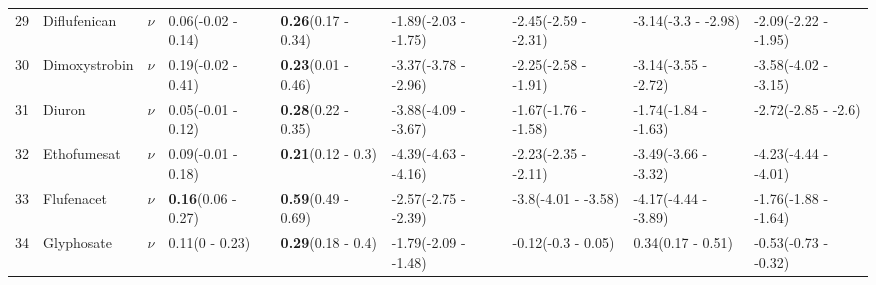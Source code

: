 \begin{landscape}
\begin{longtable}{lp{2cm}p{0.6cm}p{1.8cm}p{1.8cm}p{1.8cm}p{1.8cm}p{1.8cm}p{1.8cm}}
  29 & Diflufenican & $\nu$ & 0.06\newline (-0.02 - 0.14) & \textbf{0.26}\newline (0.17 - 0.34) & -1.89\newline (-2.03 - -1.75) & -2.45\newline (-2.59 - -2.31) & -3.14\newline (-3.3 - -2.98) & -2.09\newline (-2.22 - -1.95) \\ 
  30 & Dimoxystrobin & $\nu$ & 0.19\newline (-0.02 - 0.41) & \textbf{0.23}\newline (0.01 - 0.46) & -3.37\newline (-3.78 - -2.96) & -2.25\newline (-2.58 - -1.91) & -3.14\newline (-3.55 - -2.72) & -3.58\newline (-4.02 - -3.15) \\ 
  31 & Diuron & $\nu$ & 0.05\newline (-0.01 - 0.12) & \textbf{0.28}\newline (0.22 - 0.35) & -3.88\newline (-4.09 - -3.67) & -1.67\newline (-1.76 - -1.58) & -1.74\newline (-1.84 - -1.63) & -2.72\newline (-2.85 - -2.6) \\ 
  32 & Ethofumesat & $\nu$ & 0.09\newline (-0.01 - 0.18) & \textbf{0.21}\newline (0.12 - 0.3) & -4.39\newline (-4.63 - -4.16) & -2.23\newline (-2.35 - -2.11) & -3.49\newline (-3.66 - -3.32) & -4.23\newline (-4.44 - -4.01) \\ 
  33 & Flufenacet & $\nu$ & \textbf{0.16}\newline (0.06 - 0.27) & \textbf{0.59}\newline (0.49 - 0.69) & -2.57\newline (-2.75 - -2.39) & -3.8\newline (-4.01 - -3.58) & -4.17\newline (-4.44 - -3.89) & -1.76\newline (-1.88 - -1.64) \\ 
  34 & Glyphosate & $\nu$ & 0.11\newline (0 - 0.23) & \textbf{0.29}\newline (0.18 - 0.4) & -1.79\newline (-2.09 - -1.48) & -0.12\newline (-0.3 - 0.05) & 0.34\newline (0.17 - 0.51) & -0.53\newline (-0.73 - -0.32) \\ 

\end{longtable}
\end{landscape}
